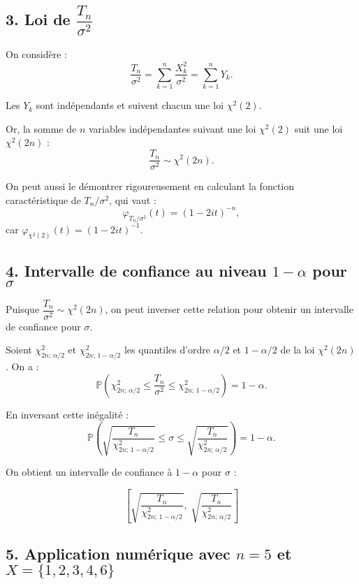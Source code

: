\documentclass[a4paper,11pt]{article}
\begin{document}
\vspace{1em}
\subsection*{3. Loi de $\dfrac{T_n}{\sigma^2}$}

On considère :
\[
\frac{T_n}{\sigma^2} = \sum_{k=1}^n \frac{X_k^2}{\sigma^2} = \sum_{k=1}^n Y_k.
\]

Les $Y_k$ sont indépendants et suivent chacun une loi $\chi^2(2)$.

Or, la somme de $n$ variables indépendantes suivant une loi $\chi^2(2)$ suit une loi $\chi^2(2n)$ :
\[
\frac{T_n}{\sigma^2} \sim \chi^2(2n).
\]

On peut aussi le démontrer rigoureusement en calculant la fonction caractéristique de $T_n/\sigma^2$, qui vaut :
\[
\varphi_{T_n/\sigma^2}(t) = \left(1 - 2it\right)^{-n},
\]
car $\varphi_{\chi^2(2)}(t) = (1 - 2it)^{-1}$.


\vspace{1em}
\subsection*{4. Intervalle de confiance au niveau $1 - \alpha$ pour $\sigma$}

Puisque $\dfrac{T_n}{\sigma^2} \sim \chi^2(2n)$, on peut inverser cette relation pour obtenir un intervalle de confiance pour $\sigma$.

Soient $\chi^2_{2n;\,\alpha/2}$ et $\chi^2_{2n;\,1-\alpha/2}$ les quantiles d’ordre $\alpha/2$ et $1 - \alpha/2$ de la loi $\chi^2(2n)$. On a :
\[
\mathbb{P} \left( \chi^2_{2n;\,\alpha/2} \leq \frac{T_n}{\sigma^2} \leq \chi^2_{2n;\,1-\alpha/2} \right) = 1 - \alpha.
\]

En inversant cette inégalité :
\[
\mathbb{P} \left( \sqrt{ \frac{T_n}{\chi^2_{2n;\,1-\alpha/2}} } \leq \sigma \leq \sqrt{ \frac{T_n}{\chi^2_{2n;\,\alpha/2}} } \right) = 1 - \alpha.
\]

On obtient un intervalle de confiance à $1 - \alpha$ pour $\sigma$ :

\[
\boxed{ \left[ \sqrt{ \frac{T_n}{\chi^2_{2n;\,1 - \alpha/2}} },\; \sqrt{ \frac{T_n}{\chi^2_{2n;\,\alpha/2}} } \right] }
\]

\vspace{1em}
\subsection*{5. Application numérique avec $n = 5$ et $X = \{1, 2, 3, 4, 6\}$}
\end{document}

